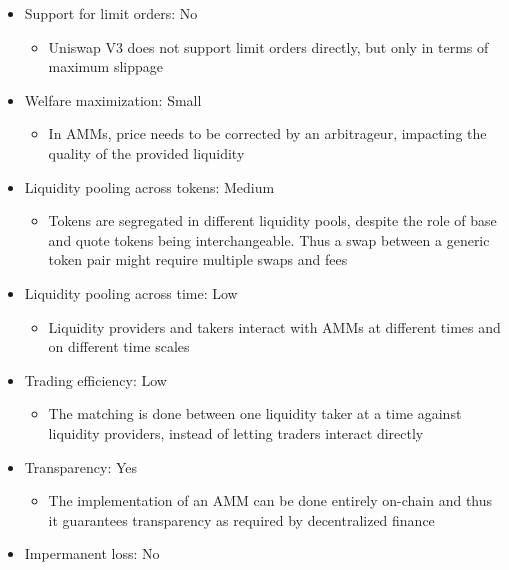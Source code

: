 \documentclass[11pt, reqno]{amsart}
\theoremstyle{definition}
\theoremstyle{remark}
\begin{document}
\begin{itemize}
    \item Support for limit orders: No
          \begin{itemize}
              \item Uniswap V3 does not support limit orders directly, but only in terms of
                    maximum slippage
          \end{itemize}
    \item Welfare maximization: Small
          \begin{itemize}
              \item In AMMs, price needs to be corrected by an arbitrageur,
                    impacting the quality of the provided liquidity
          \end{itemize}
    \item Liquidity pooling across tokens: Medium
          \begin{itemize}
              \item Tokens are segregated in different liquidity pools, despite
                    the role of base and quote tokens being interchangeable.
                    Thus a swap between a generic token pair might require multiple
                    swaps and fees
          \end{itemize}
    \item Liquidity pooling across time: Low
          \begin{itemize}
              \item Liquidity providers and takers interact with AMMs at different times
                    and on different time scales
          \end{itemize}
    \item Trading efficiency: Low
          \begin{itemize}
              \item The matching is done between one liquidity taker at a time against
                    liquidity providers, instead of letting traders interact directly
          \end{itemize}
    \item Transparency: Yes
          \begin{itemize}
              \item The implementation of an AMM can be done entirely on-chain and thus
                    it guarantees transparency as required by decentralized finance
          \end{itemize}
    \item Impermanent loss: No

\end{itemize}
\end{document}
